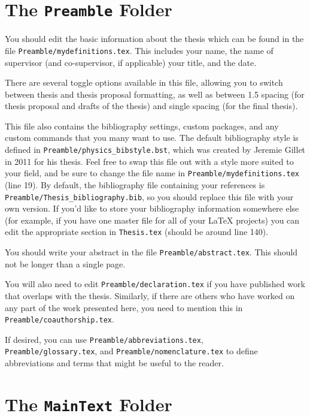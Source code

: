 \section{The \texttt{Preamble} Folder}

You should edit the basic information about the thesis
which can be found in the file \texttt{Preamble/mydefinitions.tex}. This includes
your name, the name of supervisor (and co-supervisor, if applicable) your title, 
and the date.

There are several toggle options available in this file, allowing you to
switch between thesis and thesis proposal formatting, as well as between
1.5 spacing (for thesis proposal and drafts of the thesis) and single
spacing (for the final thesis).

This file also contains the bibliography settings, custom packages, and any custom
commands that you many want to use. The default bibliography style is defined in
\texttt{Preamble/physics\_bibstyle.bst}, which was created by Jeremie Gillet in 2011
for his thesis. Feel free to swap this file out with a style more suited to your
field, and be sure to change the file name in \texttt{Preamble/mydefinitions.tex}
(line 19). By default, the bibliography file containing
your references is \texttt{Preamble/Thesis\_bibliography.bib}, so you should
replace this file with your own version. If you'd like to store your bibliography
information somewhere else (for example, if you have one master file for all of your
LaTeX projects) you can edit the appropriate section in \texttt{Thesis.tex}
(should be around line 140).

You should write your abstract in the file \texttt{Preamble/abstract.tex}. This
should not be longer than a single page.

You will also need to edit \texttt{Preamble/declaration.tex} if you have
published work that overlaps with the thesis. Similarly, if
there are others who have worked on any part of the work presented here,
you need to mention this in \texttt{Preamble/coauthorship.tex}.

If desired, you can use \texttt{Preamble/abbreviations.tex}, \\
\texttt{Preamble/glossary.tex},
and \texttt{Preamble/nomenclature.tex} to define abbreviations and terms that
might be useful to the reader.

\section{The \texttt{MainText} Folder}

